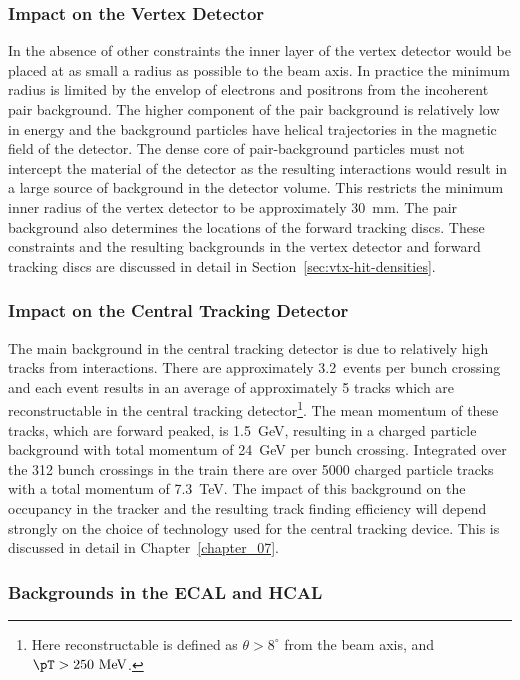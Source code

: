 \subsubsection{Impact on the Vertex Detector}  

In the absence of other constraints the inner layer of the vertex detector would
be placed at as small a radius as possible to the beam axis. In practice the
minimum radius is limited by the envelop of electrons and positrons from the
incoherent pair background. The higher \pT component of the pair background is
relatively low in energy and the background particles have helical trajectories
in the magnetic field of the detector. The dense core of pair-background
particles must not intercept the material of the detector as the resulting
interactions would result in a large source of background in the detector
volume. This restricts the minimum inner radius of the vertex detector to be
approximately 30~mm. The pair background also determines the locations of the
forward tracking discs. These constraints and the resulting backgrounds in the
vertex detector and forward tracking discs are discussed in detail in
Section~\ref{sec:vtx-hit-densities}.

\subsubsection{Impact on the Central Tracking Detector}  

The main background in the central tracking detector is due to relatively high
\pT tracks from \gghadrons interactions. There are approximately 3.2~\gghadrons events
per bunch crossing and each event results in an average of approximately 5
tracks which are reconstructable in the central tracking detector\footnote{Here
  reconstructable is defined as $\theta>8^\circ$ from the beam axis,
 and  $\pT>250~\mathrm{MeV}$.}. The mean
momentum of these tracks, which are forward peaked, is 1.5~GeV, resulting in a
charged particle background with total momentum of 24~GeV per bunch
crossing. Integrated over the 312 bunch crossings in the train there are over
5000 charged particle tracks with a total momentum of 7.3~TeV. The impact of
this background on the occupancy in the tracker and the resulting track finding
efficiency will depend strongly on the choice of technology used for the central
tracking device. This is discussed in detail in Chapter~\ref{chapter_07}.

\subsubsection{Backgrounds in the ECAL and HCAL}

